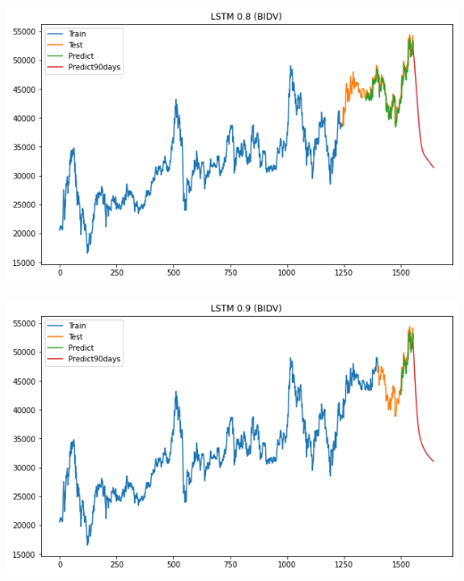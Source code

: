 \documentclass[conference]{IEEEtran}
\begin{document}
\begin{minipage}{0.23\textwidth}
    \centering
    \includegraphics[width=\linewidth]{images/LSTM/LSTM_BIDV_90days_82.png}
    \label{fig:image1}
\end{minipage}
\hfill
\begin{minipage}{0.23\textwidth}
    \centering
    \includegraphics[width=\linewidth]{images/LSTM/LSTM_BIDV_90days_91.png}
    \label{fig:image2}
\end{minipage}
\end{document}
